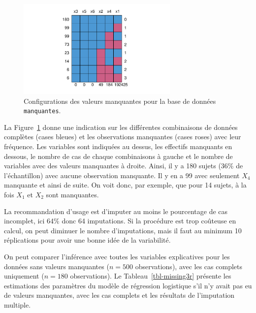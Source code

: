 \documentclass[
  11pt,
  letterpaper,
]{scrbook}
\theoremstyle{definition}
\theoremstyle{remark}
\begin{document}
\begin{figure}[ht!]

{\centering \includegraphics[width=0.7\textwidth,height=\textheight]{donneesmanquantes_files/figure-pdf/fig-manquantes2-1.pdf}

}

\caption{\label{fig-manquantes2}Configurations des valeurs manquantes
pour la base de données \texttt{manquantes}.}

\end{figure}

La Figure~\ref{fig-manquantes2} donne une indication sur les différentes
combinaisons de données complètes (cases bleues) et les observations
manquantes (cases roses) avec leur fréquence. Les variables sont
indiquées au dessus, les effectifs manquants en dessous, le nombre de
cas de chaque combinaisons à gauche et le nombre de variables avec des
valeurs manquantes à droite. Ainsi, il y a 180 sujets (36\% de
l'échantillon) avec aucune observation manquante. Il y en a 99 avec
seulement \(X_4\) manquante et ainsi de suite. On voit donc, par
exemple, que pour 14 sujets, à la fois \(X_1\) et \(X_2\) sont
manquantes.

La recommandation d'usage est d'imputer au moins le pourcentage de cas
incomplet, ici 64\% donc 64 imputations. Si la procédure est trop
coûteuse en calcul, on peut diminuer le nombre d'imputations, mais il
faut au minimum 10 réplications pour avoir une bonne idée de la
variabilité.

On peut comparer l'inférence avec toutes les variables explicatives pour
les données sans valeurs manquantes (\(n=500\) observations), avec les
cas complets uniquement (\(n=180\) observations). Le
Tableau~\ref{tbl-missing3r} présente les estimations des paramètres du
modèle de régression logistique s'il n'y avait pas eu de valeurs
manquantes, avec les cas complets et les résultats de l'imputation
multiple.
\end{document}
